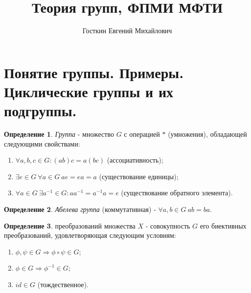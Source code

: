 \documentclass[11pt,a4paper]{report}
\title{\textbf{Теория групп, ФПМИ МФТИ}}
\author{Госткин Евгений Михайлович}
\date{}
\theoremstyle{definition}
\theoremstyle{definition}
\theoremstyle{definition}
\newtheorem{definition}{Определение}[section]
\begin{document}
  \setlength{\parindent}{1cm}
  \maketitle
  \tableofcontents
  \newpage
  \section{Понятие группы. Примеры. Циклические группы и их подгруппы.}
  \begin{definition}\label{group_def}
  {\it Группа} - множество $G$ с операцией $*$ (умножения), обладающей следующими свойствами:
 		\begin{enumerate}[1)]
	 		\item{$\forall a, b, c \in G: (ab)c = a(bc)$ (ассоциативность);}
 			\item{$\exists e \in G~ \forall a \in G~ ae=ea=a$ (существование единицы);}
 			\item{$\forall a \in G ~\exists a^{-1}\in G:aa^{-1}=a^{-1}a=e$ (существование обратного элемента).}
 		\end{enumerate}
  \end{definition}
  \begin{definition}\label{abelian_group_def}
  	{\it Абелева группа} (коммутативная) - $\forall a, b \in G~ab=ba$.
  \end{definition}
  
	\begin{definition}\label{transformation_group_def}
	{ преобразований} множества $X$ - совокупность $G$ его биективных преобразований, удовлетворяющая следующим условиям:
		\begin{enumerate}
			\item{$\phi, \psi\in G\Rightarrow\phi\circ\psi\in G$;}
			\item{$\phi\in G\Rightarrow\phi^{-1}\in G$;}
			\item{$id \in G$ (тождественное).}
		\end{enumerate}
	\end{definition}
\end{document}
